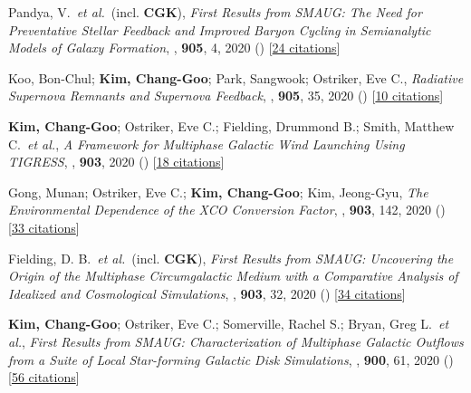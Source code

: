 \item[{30.}]Pandya, V.~\textit{et al.}~(incl. \textbf{CGK}), \textit{First Results from SMAUG: The Need for Preventative Stellar Feedback and Improved Baryon Cycling in Semianalytic Models of Galaxy Formation}, , \textbf{905}, 4, 2020 () [\href{http://adsabs.harvard.edu/abs/2020ApJ...905....4P}{24 citations}]

\item[{29.}]Koo, Bon-Chul; \textbf{Kim, Chang-Goo}; Park, Sangwook; Ostriker, Eve C., \textit{Radiative Supernova Remnants and Supernova Feedback}, , \textbf{905}, 35, 2020 () [\href{http://adsabs.harvard.edu/abs/2020ApJ...905...35K}{10 citations}]

\item[{28.}]\textbf{Kim, Chang-Goo}; Ostriker, Eve C.; Fielding, Drummond B.; Smith, Matthew C.~\textit{et al.}, \textit{A Framework for Multiphase Galactic Wind Launching Using TIGRESS}, , \textbf{903}, 2020 () [\href{http://adsabs.harvard.edu/abs/2020ApJ...903L..34K}{18 citations}]

\item[{27.}]Gong, Munan; Ostriker, Eve C.; \textbf{Kim, Chang-Goo}; Kim, Jeong-Gyu, \textit{The Environmental Dependence of the XCO Conversion Factor}, , \textbf{903}, 142, 2020 () [\href{http://adsabs.harvard.edu/abs/2020ApJ...903..142G}{33 citations}]

\item[{26.}]Fielding, D. B.~\textit{et al.}~(incl. \textbf{CGK}), \textit{First Results from SMAUG: Uncovering the Origin of the Multiphase Circumgalactic Medium with a Comparative Analysis of Idealized and Cosmological Simulations}, , \textbf{903}, 32, 2020 () [\href{http://adsabs.harvard.edu/abs/2020ApJ...903...32F}{34 citations}]

\item[{25.}]\textbf{Kim, Chang-Goo}; Ostriker, Eve C.; Somerville, Rachel S.; Bryan, Greg L.~\textit{et al.}, \textit{First Results from SMAUG: Characterization of Multiphase Galactic Outflows from a Suite of Local Star-forming Galactic Disk Simulations}, , \textbf{900}, 61, 2020 () [\href{http://adsabs.harvard.edu/abs/2020ApJ...900...61K}{56 citations}]

